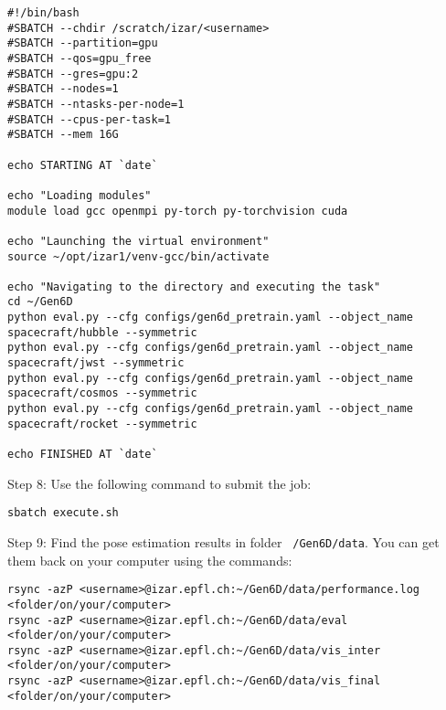 \bigskip

\begin{lstlisting}[style=bashstyle, caption={Bash script \texttt{execute.sh} to run a machine learning model on Scitas Izar EPFL. While the overall structure remains consistent, this script is specific to Gen6D's architecture.}]
#!/bin/bash
#SBATCH --chdir /scratch/izar/<username>
#SBATCH --partition=gpu
#SBATCH --qos=gpu_free
#SBATCH --gres=gpu:2
#SBATCH --nodes=1
#SBATCH --ntasks-per-node=1
#SBATCH --cpus-per-task=1
#SBATCH --mem 16G

echo STARTING AT `date`

echo "Loading modules"
module load gcc openmpi py-torch py-torchvision cuda

echo "Launching the virtual environment"
source ~/opt/izar1/venv-gcc/bin/activate

echo "Navigating to the directory and executing the task"
cd ~/Gen6D                                    
python eval.py --cfg configs/gen6d_pretrain.yaml --object_name spacecraft/hubble --symmetric
python eval.py --cfg configs/gen6d_pretrain.yaml --object_name spacecraft/jwst --symmetric
python eval.py --cfg configs/gen6d_pretrain.yaml --object_name spacecraft/cosmos --symmetric
python eval.py --cfg configs/gen6d_pretrain.yaml --object_name spacecraft/rocket --symmetric

echo FINISHED AT `date`
\end{lstlisting}

\bigskip


\noindent Step 8: Use the following command to submit the job:
{ \captionsetup{labelformat=empty,labelsep=none}
\begin{lstlisting}[style=bashstyle, caption=\null]
sbatch execute.sh
\end{lstlisting}
}

\vspace{-0.4cm}

\noindent Step 9: Find the pose estimation results in folder \texttt{~/Gen6D/data}. You can get them back on your computer using the commands:
{ \captionsetup{labelformat=empty,labelsep=none}
\begin{lstlisting}[style=bashstyle, caption=\null, keywordstyle=\color{black}]
rsync -azP <username>@izar.epfl.ch:~/Gen6D/data/performance.log <folder/on/your/computer>
rsync -azP <username>@izar.epfl.ch:~/Gen6D/data/eval <folder/on/your/computer>
rsync -azP <username>@izar.epfl.ch:~/Gen6D/data/vis_inter <folder/on/your/computer>
rsync -azP <username>@izar.epfl.ch:~/Gen6D/data/vis_final <folder/on/your/computer>
\end{lstlisting}
}
\bigskip


